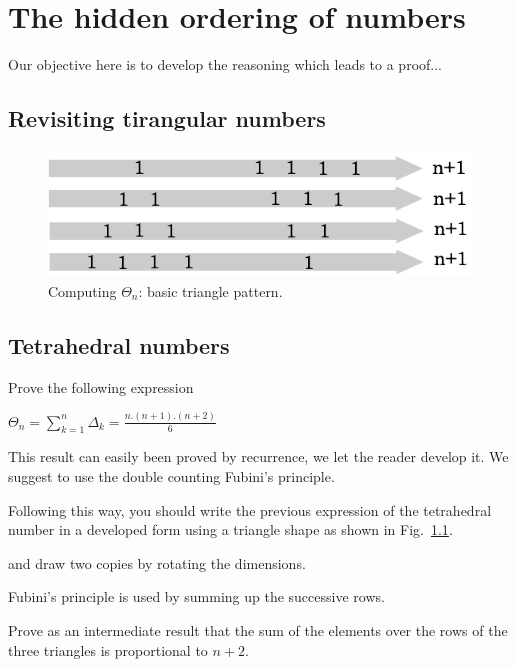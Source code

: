 
\chapter{The hidden ordering of numbers}
\label{Appendix:Tetra}

Our objective here is to develop the reasoning which leads to a proof...

\section{Revisiting tirangular numbers}

\begin{figure}[h]
\begin{center}
        \includegraphics[scale=0.4]{FiguresArithmetic/appTetrahedral2}
        \caption{Computing $\Theta_n$: basic triangle pattern.}
        \label{fig:Tetrahedral2}
\end{center}
\end{figure}

\section{Tetrahedral numbers}
\label{sec:tetraedralNumbers}

Prove the following expression

$\Theta_n =  \sum_{k=1}^{n} \Delta_k = \frac{n.(n+1).(n+2)}{6}$
\medskip


This result can easily been proved by recurrence, we let the reader develop it. 
We suggest to use the double counting Fubini's principle.

Following this way, you should write the previous expression of the tetrahedral number in a developed form 
using a triangle shape as shown in Fig.~\ref{fig:Tetrahedral2}.

and draw two copies by rotating the dimensions.

Fubini's principle is used by summing up the successive rows.

Prove as an intermediate result that the sum of the elements over the rows of the three triangles is proportional to $n+2$.
\medskip

